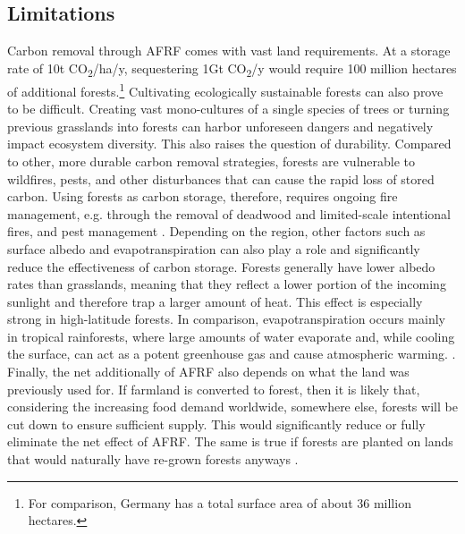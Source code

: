 \subsection*{Limitations}
Carbon removal through AFRF comes with vast land requirements. At a storage rate of 10t CO\textsubscript{2}/ha/y, sequestering 1Gt CO\textsubscript{2}/y would require 100 million hectares of additional forests.\footnote{For comparison, Germany has a total surface area of about 36 million hectares.} Cultivating ecologically sustainable forests can also prove to be difficult. Creating vast mono-cultures of a single species of trees or turning previous grasslands into forests can harbor unforeseen dangers and negatively impact ecosystem diversity. This also raises the question of durability. Compared to other, more durable carbon removal strategies, forests are vulnerable to wildfires, pests, and other disturbances that can cause the rapid loss of stored carbon. Using forests as carbon storage, therefore, requires ongoing fire management, e.g. through the removal of deadwood and limited-scale intentional fires, and pest management \parencite{Watson2000LandForestry}. Depending on the region, other factors such as surface albedo and evapotranspiration can also play a role and significantly reduce the effectiveness of carbon storage. Forests generally have lower albedo rates than grasslands, meaning that they reflect a lower portion of the incoming sunlight and therefore trap a larger amount of heat. This effect is especially strong in high-latitude forests. In comparison, evapotranspiration occurs mainly in tropical rainforests, where large amounts of water evaporate and, while cooling the surface, can act as a potent greenhouse gas and cause atmospheric warming. \parencite{NationalResearchCouncil2015ClimateSequestration}. Finally, the net additionally of AFRF also depends on what the land was previously used for. If farmland is converted to forest, then it is likely that, considering the increasing food demand worldwide, somewhere else, forests will be cut down to ensure sufficient supply. This would significantly reduce or fully eliminate the net effect of AFRF. The same is true if forests are planted on lands that would naturally have re-grown forests anyways \parencite[128]{Gates2021HowDisaster}.\\
